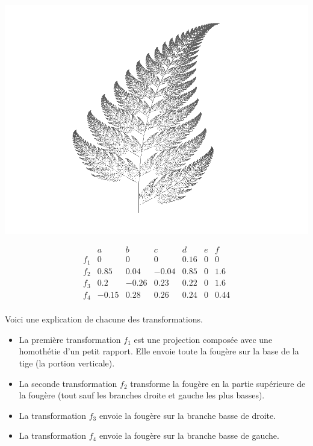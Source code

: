 \documentclass[11pt,class=report,crop=false]{standalone}
\begin{document}
\begin{center}
 \includegraphics[scale=.5]{images/IFS-fern1.png} \\[2mm]
\end{center}

\begin{displaymath}
\begin{array}{c|cccccc}
     & a & b & c & d & e & f \\
\hline
f_1 & 0 & 0 & 0 & 0.16 & 0 & 0 \\
\hline
f_2  & 0.85 &0.04&-0.04&0.85&0&1.6 \\
\hline
f_3 & 0.2 & -0.26 & 0.23 & 0.22 & 0 & 1.6 \\
\hline
f_4  & -0.15 & 0.28 & 0.26 & 0.24 & 0 & 0.44 \\
\end{array}
\end{displaymath}

Voici une explication de chacune des transformations. 
\begin{itemize}
  \item La première transformation $f_1$ est une projection composée avec une homothétie d'un petit rapport. Elle envoie toute la fougère sur la base de la tige (la portion verticale).
  \item La seconde transformation $f_2$ transforme la fougère en la partie supérieure de la fougère (tout sauf les branches droite et gauche les plus basses).
  \item La transformation $f_3$ envoie la fougère sur la branche basse de droite.
  \item La transformation $f_4$ envoie la fougère sur la branche basse de gauche.  
\end{itemize}
\end{document}
